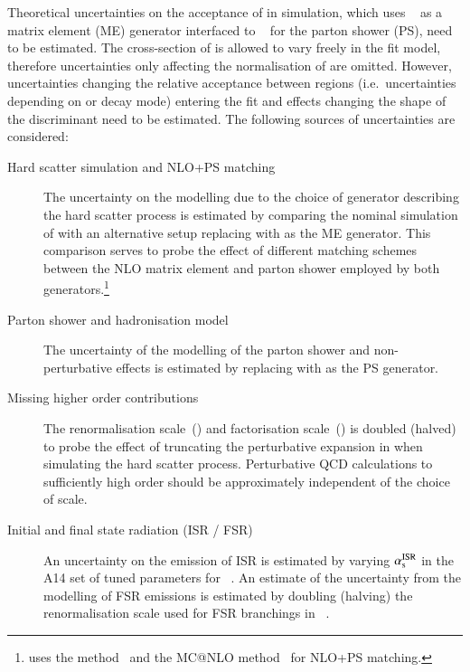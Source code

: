Theoretical uncertainties on the acceptance of \ttbar in simulation,
which uses \POWHEGBOX[v2]~\cite{Frixione:2007nw} as a matrix element
(ME) generator interfaced to \PYTHIA[8.230]~\cite{Sjostrand:2014zea}
for the parton shower (PS), need to be estimated. The cross-section of
\ttbar is allowed to vary freely in the fit model, therefore
uncertainties only affecting the normalisation of \ttbar are
omitted. However, uncertainties changing the relative acceptance
between regions (i.e.\ uncertainties depending on \tauhadvis \pT or
decay mode) entering the fit and effects changing the shape of the
\mTW discriminant need to be estimated. The following sources of
uncertainties are considered:
\begin{description}

\item[Hard scatter simulation and NLO+PS matching] The uncertainty on
  the modelling due to the choice of generator describing the hard
  scatter process is estimated by comparing the nominal simulation of
  \ttbar with an alternative setup replacing \POWHEGBOX[v2] with
  \MGNLO as the ME generator. This comparison serves to probe the
  effect of different matching schemes between the NLO matrix element
  and parton shower employed by both
  generators.\footnote{\POWHEGBOX[v2] uses the \POWHEG
    method~\cite{Nason:2004rx,Frixione:2007vw,Alioli:2010xd} and
    \MGNLO the MC@NLO method~\cite{Frixione:2002ik} for NLO+PS
    matching.}

\item[Parton shower and hadronisation model] The uncertainty of the
  modelling of the parton shower and non-perturbative effects is
  estimated by replacing \PYTHIA[8] with \HERWIG[7.0.4] as the PS
  generator.

\item[Missing higher order contributions] The renormalisation
  scale~(\muR) and factorisation scale~(\muF) is doubled (halved) to
  probe the effect of truncating the perturbative expansion in \alphas
  when simulating the hard scatter process. Perturbative QCD
  calculations to sufficiently high order should be approximately
  independent of the choice of scale.

\item[Initial and final state radiation (ISR / FSR)] An uncertainty on
  the emission of ISR is estimated by varying $\alpha_{\text{s}}^\text{ISR}$ in
  the A14 set of tuned parameters for
  \PYTHIA[8]~\cite{ATL-PHYS-PUB-2014-021}.
  An estimate of the uncertainty from the modelling of FSR emissions
  is estimated by doubling (halving) the renormalisation scale used
  for FSR branchings in
  \PYTHIA[8]~\cite{Sjostrand:2014zea,Mrenna:2016sih,pythia-variations-online}.


\end{description}
